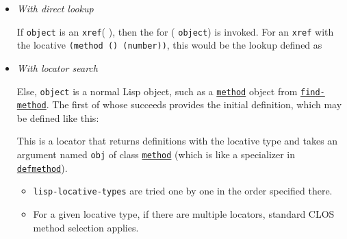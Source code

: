 \begin{itemize}
\item
  \emph{With direct lookup}

  If \texttt{object} is an
  \texttt{xref}(
  ), then the
  for
  (
  \texttt{object}) is invoked. For an \texttt{xref} with the locative
  \texttt{(method\ ()\ (number))}, this would be the lookup defined as

\begin{Shaded}
\begin{Highlighting}[]
\end{Highlighting}
\end{Shaded}
\item
  \emph{With locator search}

  Else, \texttt{object} is a normal Lisp object, such as a
  \href{http://www.lispworks.com/documentation/HyperSpec/Body/t_method.htm}{\texttt{method}}
  object from
  \href{http://www.lispworks.com/documentation/HyperSpec/Body/f_find_m.htm}{\texttt{find-method}}.
  The first of
  whose
  succeeds provides the initial definition, which may be defined like
  this:

\begin{Shaded}
\begin{Highlighting}[]
\end{Highlighting}
\end{Shaded}

  This is a locator that returns definitions with the
   locative
  type and takes an argument named \texttt{obj} of class
  \href{http://www.lispworks.com/documentation/HyperSpec/Body/t_method.htm}{\texttt{method}}
  (which is like a specializer in
  \href{http://www.lispworks.com/documentation/HyperSpec/Body/m_defmet.htm}{\texttt{defmethod}}).

  \begin{itemize}
  \item
    \texttt{lisp-locative-types} are tried one by one in the order
    specified there.
  \item
    For a given locative type, if there are multiple locators, standard
    CLOS method selection applies.
  \end{itemize}
\end{itemize}

